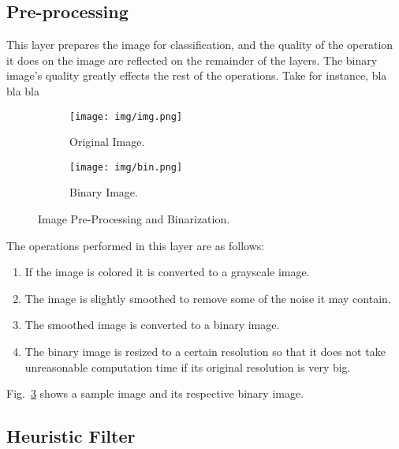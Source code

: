 \documentclass[conference]{IEEEtran}
\begin{document}
    \subsection{Pre-processing}

    This layer prepares the image for classification, and the quality of the operation it does on the image are reflected
    on the remainder of the layers.
    The binary image's quality greatly effects the rest of the operations.
    Take for instance, bla bla bla

    \begin{figure}[htbp]
        \centering
        \begin{subfigure}[b]{0.49\linewidth}
            \centering
            \texttt{[image: img/img.png]}
            \caption{Original Image.}
            \label{img:org}
        \end{subfigure}
        \hfill
        \begin{subfigure}[b]{0.49\linewidth}
            \centering
            \texttt{[image: img/bin.png]}
            \caption{Binary Image.}
            \label{img:bin}
        \end{subfigure}
        \caption{Image Pre-Processing and Binarization.}
        \label{fig:bin}
    \end{figure}

    The operations performed in this layer are as follows:
    \begin{enumerate}
        \item If the image is colored it is converted to a grayscale image.
        \item The image is slightly smoothed to remove some of the noise it may contain.
        \item The smoothed image is converted to a binary image.
        \item The binary image is resized to a certain resolution so that it does not take
        unreasonable computation time if its original resolution is very big.
    \end{enumerate}

    Fig.~\ref{fig:bin} shows a sample image and its respective binary image.


    \subsection{Heuristic Filter}
\end{document}
